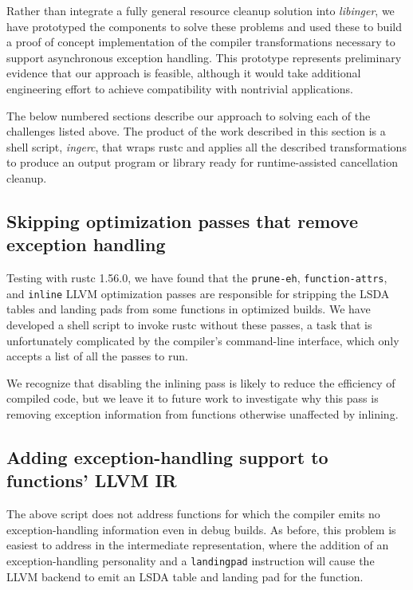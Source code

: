 Rather than integrate a fully general resource cleanup solution into
\textit{libinger}, we have prototyped the components to solve these problems and used
these to build a proof of concept implementation of the compiler transformations
necessary to support asynchronous exception handling.  This prototype represents
preliminary evidence that our approach is feasible, although it would take additional
engineering effort to achieve compatibility with nontrivial applications.

The below numbered sections describe our approach to solving each of the
challenges listed above.  The product of the work described in this section is a
shell script, \textit{ingerc}, that wraps rustc and applies all the described
transformations to produce an output program or library ready for runtime-assisted
cancellation cleanup.


\subsection{Skipping optimization passes that remove exception handling}
\label{sec:ingerc:skip}

Testing with rustc 1.56.0, we have found that the \texttt{prune-eh},
\texttt{function-attrs}, and \texttt{inline} LLVM optimization passes are
responsible for stripping the LSDA tables and landing pads from some functions in
optimized builds.  We have developed a shell script to invoke rustc without these
passes, a task that is unfortunately complicated by the compiler's command-line
interface, which only accepts a list of all the passes to run.

We recognize that disabling the inlining pass is likely to reduce the efficiency of
compiled code, but we leave it to future work to investigate why this pass is
removing exception information from functions otherwise unaffected by inlining.


\subsection{Adding exception-handling support to functions' LLVM IR}
\label{sec:ingerc:optimization}

The above script does not address functions for which the compiler emits no
exception-handling information even in debug builds.  As before, this problem is
easiest to address in the intermediate representation, where the addition of an
exception-handling personality and a \texttt{landingpad} instruction will cause the
LLVM backend to emit an LSDA table and landing pad for the function.

